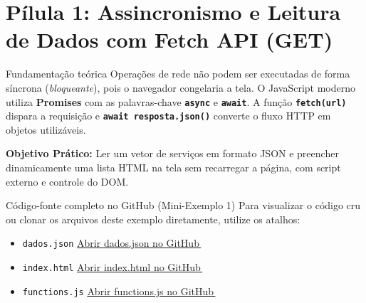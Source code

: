 \section{Pílula 1: Assincronismo e Leitura de Dados com Fetch API (GET)}\label{sec:pilula1}

\begin{conceito}{Fundamentação teórica}
Operações de rede não podem ser executadas de forma síncrona (\textit{bloqueante}), pois o navegador congelaria a tela. O JavaScript moderno utiliza \textbf{Promises} com as palavras-chave \textbf{\texttt{async}} e \textbf{\texttt{await}}. A função \textbf{\texttt{fetch(url)}} dispara a requisição e \textbf{\texttt{await resposta.json()}} converte o fluxo HTTP em objetos utilizáveis.
\end{conceito}

\begin{boxAtividade}
\textbf{Objetivo Prático:} Ler um vetor de serviços em formato JSON e preencher dinamicamente uma lista HTML na tela sem recarregar a página, com script externo e controle do DOM.
\end{boxAtividade}

\begin{repositorio}{Código-fonte completo no GitHub (Mini-Exemplo 1)}
Para visualizar o código cru ou clonar os arquivos deste exemplo diretamente, utilize os atalhos:
\begin{itemize}[nosep]
  \item \texttt{dados.json} \seta \href{https://github.com/chameoandre/CST-Sistemas-para-internet-programacao-para-internet-2/blob/main/roteiro-5/mini-exemplos/01-fetch-get/dados.json}{Abrir dados.json no GitHub\,{\scriptsize\faExternalLinkAlt}}
  \item \texttt{index.html} \seta \href{https://github.com/chameoandre/CST-Sistemas-para-internet-programacao-para-internet-2/blob/main/roteiro-5/mini-exemplos/01-fetch-get/index.html}{Abrir index.html no GitHub\,{\scriptsize\faExternalLinkAlt}}
  \item \texttt{functions.js} \seta \href{https://github.com/chameoandre/CST-Sistemas-para-internet-programacao-para-internet-2/blob/main/roteiro-5/mini-exemplos/01-fetch-get/functions.js}{Abrir functions.js no GitHub\,{\scriptsize\faExternalLinkAlt}}
\end{itemize}
\end{repositorio}

